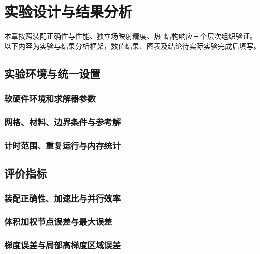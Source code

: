 \chapter{实验设计与结果分析}
\label{chap:experiments}

本章按照装配正确性与性能、独立场映射精度、热--结构响应三个层次组织验证。
以下内容为实验与结果分析框架，数值结果、图表及结论待实际实验完成后填写。

\section{实验环境与统一设置}
\subsection{软硬件环境和求解器参数}
\thesisdraftnote

\subsection{网格、材料、边界条件与参考解}
\thesisdraftnote

\subsection{计时范围、重复运行与内存统计}
\thesisdraftnote

\section{评价指标}
\subsection{装配正确性、加速比与并行效率}
\thesisdraftnote

\subsection{体积加权节点误差与最大误差}
\thesisdraftnote

\subsection{梯度误差与局部高梯度区域误差}
\thesisdraftnote

